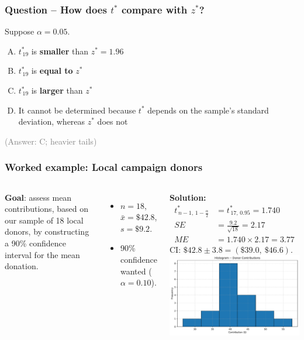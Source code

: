 \documentclass[handout]{beamer}
\begin{document}
\begin{frame}
\frametitle{Question – How does \(t^{\ast}\) compare with \(z^{\ast}\)?}
Suppose \(\alpha=0.05\).
\begin{enumerate}[A.]
  \item \(t^{\ast}_{\,19}\) is \textbf{smaller} than \(z^{\ast}=1.96\)
  \item \(t^{\ast}_{\,19}\) is \textbf{equal to} \(z^{\ast}\)
  \item \(t^{\ast}_{\,19}\) is \textbf{larger} than \(z^{\ast}\)
  \item It cannot be determined because \(t^{\ast}\) depends on the sample’s standard deviation, whereas \(z^{\ast}\) does not
\end{enumerate}
\pause
\textcolor{gray}{(Answer: C; heavier tails)}
\end{frame}

\begin{frame}
\frametitle{Worked example: Local campaign donors}
\vspace{-0.5em}
\begin{columns}[T]
\footnotesize
{}
\textbf{Goal}: assess mean contributions, based on our sample of 18 local donors, by constructing a 90\% confidence interval for the mean donation.
\begin{itemize}
  \item \(n=18\), \(\bar x=\$42.8\), \(s=\$9.2\).
  \item 90\% confidence wanted (\(\alpha=0.10\)).
\end{itemize}
\pause
\textbf{Solution:}
\begin{align*}
t^{\ast}_{\,n-1,\,1-\frac{\alpha}{2}} &= t^{\ast}_{\,17,\,0.95}  = 1.740 \\
SE &= \frac{9.2}{\sqrt{18}} = 2.17 \\
ME &= 1.740\times2.17 = 3.77
\end{align*}
CI:\; \(\$42.8 \pm 3.8 = (\$39.0,\ \$46.6)\).
\vspace{3em}
\includegraphics[width=\textwidth]{Figures/donor_hist.pdf}
\end{columns}
\end{frame}
\end{document}
